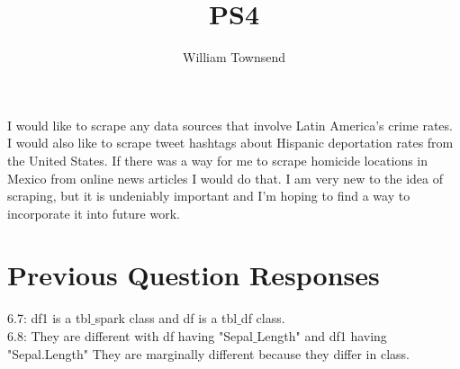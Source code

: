 \documentclass{article}
\title{PS4}
\author{William Townsend}
\begin{document}
\maketitle

I would like to scrape any data sources that involve Latin America's crime rates. I would also like to scrape tweet hashtags about Hispanic deportation rates from the United States. If there was a way for me to scrape homicide locations in Mexico from online news articles I would do that. I am very new to the idea of scraping, but it is undeniably important and I'm hoping to find a way to incorporate it into future work.

\section{Previous Question Responses}
6.7: df1 is a tbl$\_$spark class and df is a tbl$\_$df class.\\
6.8: They are different with df having "Sepal$\_$Length" and df1 having "Sepal.Length" They are marginally different because they differ in class.
\end{document}
